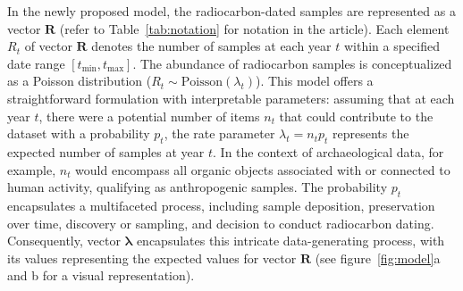 \documentclass[a4paper]{article}
\begin{document}
In the newly proposed model, the radiocarbon-dated samples are represented as a vector $\bm{R}$ (refer to Table~\ref{tab:notation} for notation in the article). Each element $R_t$ of vector $\bm{R}$ denotes the number of samples at each year $t$ within a specified date range $\left[t_{\min},t_{\max}\right]$. The abundance of radiocarbon samples is conceptualized as a Poisson distribution ($R_t \sim \mathrm{Poisson}(\lambda_t)$). This model offers a straightforward formulation with interpretable parameters: assuming that at each year $t$, there were a potential number of items $n_t$ that could contribute to the dataset with a probability $p_t$, the rate parameter $\lambda_t=n_tp_t$ represents the expected number of samples at year $t$. In the context of archaeological data, for example, $n_t$ would encompass all organic objects associated with or connected to human activity, qualifying as anthropogenic samples. The probability $p_t$ encapsulates a multifaceted process, including sample deposition, preservation over time, discovery or sampling, and decision to conduct radiocarbon dating. Consequently, vector $\bm{\lambda}$ encapsulates this intricate data-generating process, with its values representing the expected values for vector $\bm{R}$ (see figure~\ref{fig:model}a and b for a visual representation).
\\
\end{document}
